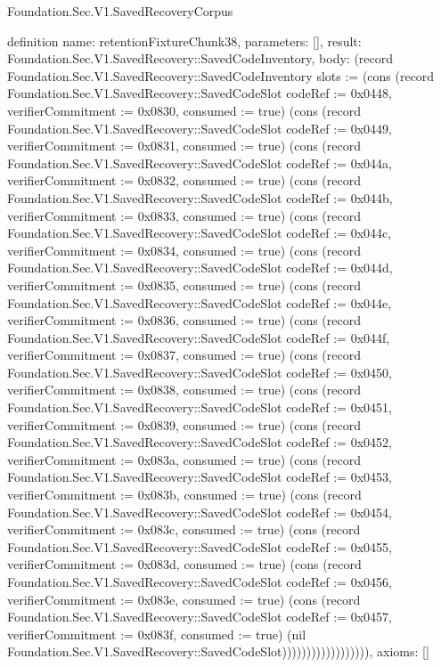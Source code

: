 \begin{lexlean}{Foundation.Sec.V1.SavedRecoveryCorpus}
\begin{semanticmodule}
definition{
  name: retentionFixtureChunk38,
  parameters: [],
  result: Foundation.Sec.V1.SavedRecovery::SavedCodeInventory,
  body: (record Foundation.Sec.V1.SavedRecovery::SavedCodeInventory {slots := (cons (record Foundation.Sec.V1.SavedRecovery::SavedCodeSlot {codeRef := 0x0448, verifierCommitment := 0x0830, consumed := true}) (cons (record Foundation.Sec.V1.SavedRecovery::SavedCodeSlot {codeRef := 0x0449, verifierCommitment := 0x0831, consumed := true}) (cons (record Foundation.Sec.V1.SavedRecovery::SavedCodeSlot {codeRef := 0x044a, verifierCommitment := 0x0832, consumed := true}) (cons (record Foundation.Sec.V1.SavedRecovery::SavedCodeSlot {codeRef := 0x044b, verifierCommitment := 0x0833, consumed := true}) (cons (record Foundation.Sec.V1.SavedRecovery::SavedCodeSlot {codeRef := 0x044c, verifierCommitment := 0x0834, consumed := true}) (cons (record Foundation.Sec.V1.SavedRecovery::SavedCodeSlot {codeRef := 0x044d, verifierCommitment := 0x0835, consumed := true}) (cons (record Foundation.Sec.V1.SavedRecovery::SavedCodeSlot {codeRef := 0x044e, verifierCommitment := 0x0836, consumed := true}) (cons (record Foundation.Sec.V1.SavedRecovery::SavedCodeSlot {codeRef := 0x044f, verifierCommitment := 0x0837, consumed := true}) (cons (record Foundation.Sec.V1.SavedRecovery::SavedCodeSlot {codeRef := 0x0450, verifierCommitment := 0x0838, consumed := true}) (cons (record Foundation.Sec.V1.SavedRecovery::SavedCodeSlot {codeRef := 0x0451, verifierCommitment := 0x0839, consumed := true}) (cons (record Foundation.Sec.V1.SavedRecovery::SavedCodeSlot {codeRef := 0x0452, verifierCommitment := 0x083a, consumed := true}) (cons (record Foundation.Sec.V1.SavedRecovery::SavedCodeSlot {codeRef := 0x0453, verifierCommitment := 0x083b, consumed := true}) (cons (record Foundation.Sec.V1.SavedRecovery::SavedCodeSlot {codeRef := 0x0454, verifierCommitment := 0x083c, consumed := true}) (cons (record Foundation.Sec.V1.SavedRecovery::SavedCodeSlot {codeRef := 0x0455, verifierCommitment := 0x083d, consumed := true}) (cons (record Foundation.Sec.V1.SavedRecovery::SavedCodeSlot {codeRef := 0x0456, verifierCommitment := 0x083e, consumed := true}) (cons (record Foundation.Sec.V1.SavedRecovery::SavedCodeSlot {codeRef := 0x0457, verifierCommitment := 0x083f, consumed := true}) (nil Foundation.Sec.V1.SavedRecovery::SavedCodeSlot)))))))))))))))))}),
  axioms: []
}


\end{semanticmodule}
\end{lexlean}
